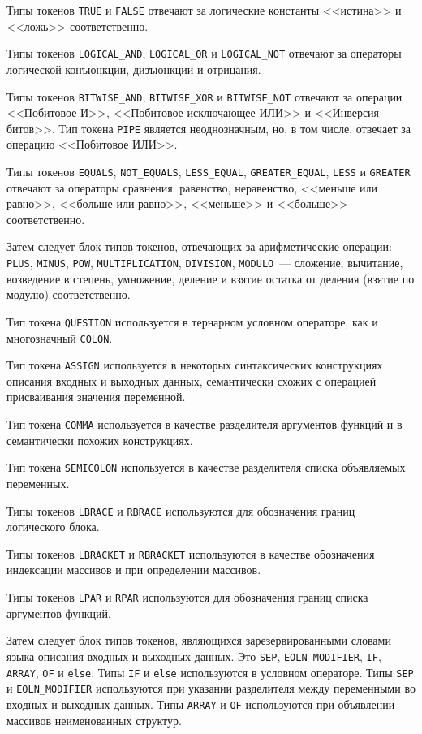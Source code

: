 \documentclass[times,specification,annotation]{style/itmo-student-thesis/itmo-student-thesis}
\begin{document}
Типы токенов \texttt{TRUE} и \texttt{FALSE} отвечают за логические константы <<истина>> и <<ложь>> соответственно.

Типы токенов \texttt{LOGICAL\_AND}, \texttt{LOGICAL\_OR} и \texttt{LOGICAL\_NOT} отвечают за операторы логической конъюнкции, дизъюнкции и отрицания. 

Типы токенов \texttt{BITWISE\_AND}, \texttt{BITWISE\_XOR} и \texttt{BITWISE\_NOT} отвечают за операции <<Побитовое И>>, <<Побитовое исключающее ИЛИ>> и <<Инверсия битов>>. Тип токена \texttt{PIPE} является неоднозначным, но, в том числе, отвечает за операцию <<Побитовое ИЛИ>>.

Типы токенов \texttt{EQUALS}, \texttt{NOT\_EQUALS}, \texttt{LESS\_EQUAL}, \texttt{GREATER\_EQUAL}, \texttt{LESS} и \texttt{GREATER} отвечают за операторы сравнения: равенство, неравенство, <<меньше или равно>>, <<больше или равно>>, <<меньше>> и <<больше>> соответственно.

Затем следует блок типов токенов, отвечающих за арифметические операции: \texttt{PLUS}, \texttt{MINUS}, \texttt{POW}, \texttt{MULTIPLICATION}, \texttt{DIVISION}, \texttt{MODULO}~--- сложение, вычитание, возведение в степень, умножение, деление и взятие остатка от деления (взятие по модулю) соответственно.

Тип токена \texttt{QUESTION} используется в тернарном условном операторе, как и многозначный \texttt{COLON}.

Тип токена \texttt{ASSIGN} используется в некоторых синтаксических конструкциях описания входных и выходных данных, семантически схожих с операцией присваивания значения переменной.

Тип токена \texttt{COMMA} используется в качестве разделителя аргументов функций и в семантически похожих конструкциях.

Тип токена \texttt{SEMICOLON} используется в качестве разделителя списка объявляемых переменных.

Типы токенов \texttt{LBRACE} и \texttt{RBRACE} используются для обозначения границ логического блока.

Типы токенов \texttt{LBRACKET} и \texttt{RBRACKET} используются в качестве обозначения индексации массивов и при определении массивов.

Типы токенов \texttt{LPAR} и \texttt{RPAR} используются для обозначения границ списка аргументов функций.

Затем следует блок типов токенов, являющихся зарезервированными словами языка описания входных и выходных данных. Это \texttt{SEP}, \texttt{EOLN\_MODIFIER}, \texttt{IF}, \texttt{ARRAY}, \texttt{OF} и \texttt{else}. Типы \texttt{IF} и \texttt{else} используются в условном операторе. Типы \texttt{SEP} и \texttt{EOLN\_MODIFIER} используются при указании разделителя между переменными во входных и выходных данных. Типы \texttt{ARRAY} и \texttt{OF} используются при объявлении массивов неименованных структур.
\end{document}
